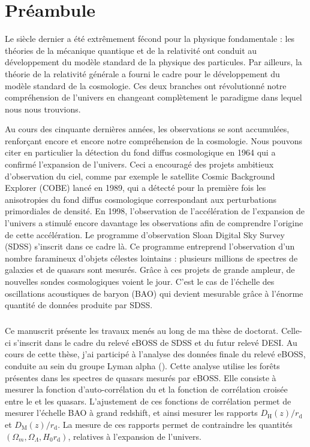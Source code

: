 % 

% 


\chapter*{Préambule}
\thispagestyle{plain}
Le  siècle dernier a été extrêmement fécond pour la physique fondamentale : les théories de la mécanique quantique et de la relativité ont conduit au développement du modèle standard de la physique des particules. Par ailleurs, la théorie de la relativité générale a fourni le cadre pour le développement du modèle standard de la cosmologie. Ces deux branches ont révolutionné notre compréhension de l'univers en changeant complètement le paradigme dans lequel nous nous trouvions.

Au cours des cinquante dernières années, les observations se sont accumulées, renforçant encore et encore notre compréhension de la cosmologie. Nous pouvons citer en particulier la détection du fond diffus cosmologique en 1964 qui a confirmé l'expansion de l'univers. Ceci a encouragé des projets ambitieux d'observation du ciel, comme par exemple le satellite Cosmic Background Explorer (COBE) lancé en 1989, qui a détecté pour la première fois les anisotropies du fond diffus cosmologique correspondant aux perturbations primordiales de densité.
En 1998, l'observation de l'accélération de l'expansion de l'univers a stimulé encore davantage les observations afin de comprendre l'origine de cette accélération. Le programme d'observation Sloan Digital Sky Survey (SDSS) s'inscrit dans ce cadre là. Ce programme entreprend l'observation d'un nombre faramineux d'objets célestes lointains : plusieurs millions de spectres de galaxies et de quasars sont mesurés.
Grâce à ces projets de grande ampleur, de nouvelles sondes cosmologiques voient le jour. C'est le cas de l'échelle des oscillations acoustiques de baryon (BAO) qui devient mesurable grâce à l'énorme quantité de données produite par SDSS.

\paragraph{}
Ce manuscrit présente les travaux menés au long de ma thèse de doctorat.
Celle-ci s'inscrit dans le cadre du relevé eBOSS de SDSS et du futur relevé DESI.
Au cours de cette thèse, j'ai participé à l'analyse des données finale du relevé eBOSS, conduite au sein du groupe Lyman alpha (\lya{}).
Cette analyse utilise les forêts \lya{} présentes dans les spectres de quasars mesurés par eBOSS.
Elle consiste à mesurer la fonction d'auto-corrélation du \lya{} et la fonction de corrélation croisée entre le \lya{} et les quasars.
L'ajustement de ces fonctions de corrélation permet de mesurer l'échelle BAO à grand redshift, et ainsi mesurer les rapports $D_{\mathrm{H}}(z) / r_{\mathrm{d}}$ et $D_{\mathrm{M}}(z) / r_{\mathrm{d}}$. La mesure de ces rapports permet de contraindre les quantités $(\Omega_{m} , \Omega_{\Lambda} , H_0 r_{\mathrm{d}})$, relatives à l'expansion de l'univers.


